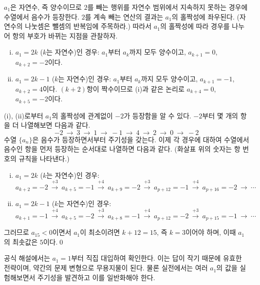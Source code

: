 \documentclass{article}
\begin{document}
\begin{sol}
	$a_1$은 자연수, 즉 양수이므로 $2$를 빼는 행위를 자연수 범위에서 지속하지 못하는 경우에 수열에서 음수가 등장한다. $2$를 계속 빼는 연산의 결과는 $a_1$의 홀짝성에 좌우된다. (자연수의 나눗셈은 뺄셈의 반복임에 주목하라.) 따라서 $a_1$의 홀짝성에 따라 경우를 나누어 항의 부호가 바뀌는 지점을 관찰하자.
	\begin{enumerate}[(i)]
		\item $a_1=2k$ ($k$는 자연수)인 경우: $a_1$부터 $a_k$까지 모두 양수이고, $a_{k+1}=0$, $a_{k+2}=-2$이다.
		\item $a_1=2k-1$ ($k$는 자연수)인 경우: $a_1$부터 $a_k$까지 모두 양수이고, $a_{k+1}=-1$, $a_{k+2}=4$이다. $(k+2)$항이 짝수이므로 (i)과 같은 논리로 $a_{k+4}=0$, $a_{k+5}=-2$이다.
	\end{enumerate}
	(i), (ii)로부터 $a_1$의 홀짝성에 관계없이 $-2$가 등장함을 알 수 있다. $-2$부터 몇 개의 항을 더 나열해보면 다음과 같다.
	\[
		-2~\rightarrow~3~\rightarrow~1~\rightarrow~-1~\rightarrow~4~\rightarrow~2~\rightarrow~0~\rightarrow~-2
	\]
	수열 $\{a_n\}$은 음수가 등장하면서부터 주기성을 갖는다. 이제 각 경우에 대하여 수열에서 음수인 항을 먼저 등장하는 순서대로 나열하면 다음과 같다. (화살표 위의 숫자는 항 번호의 규칙을 나타낸다.)
	\begin{enumerate}[(i)]
		\item $a_1=2k$ ($k$는 자연수)인 경우:
			\[
				a_{k+2}=-2~\xrightarrow{+3}~a_{k+5}=-1~\xrightarrow{+4}~a_{k+9}=-2~\xrightarrow{+3}~a_{p+12}=-1~\xrightarrow{+4}~a_{p+16}=-2~\xrightarrow{}~\cdots
			\]
		\item $a_1=2k-1$ ($k$는 자연수)인 경우:
			\[
				a_{k+1}=-1~\xrightarrow{+4}~a_{k+5}=-2~\xrightarrow{+3}~a_{k+8}=-1~\xrightarrow{+4}~a_{p+12}=-2~\xrightarrow{+3}~a_{p+15}=-1~\xrightarrow{}~\cdots
			\]
	\end{enumerate}
	그러므로 $a_{15}<0$이면서 $a_1$이 최소이려면 $k+12=15$, 즉 $k=3$이어야 하며, 이때 $a_1$의 최솟값은 $5$이다.\qed
\end{sol}

\begin{remark}[참고]
	공식 해설에서는 $a_1=1$부터 직집 대입하여 확인한다. 이는 답이 작기 때문에 유효한 전략이며, 약간의 문제 변형으로 무용지물이 된다. 물론 실전에서는 여러 $a_1$의 값을 실험해보면서 주기성을 발견하고 이를 일반화해야 한다.	
\end{remark}
\end{document}
